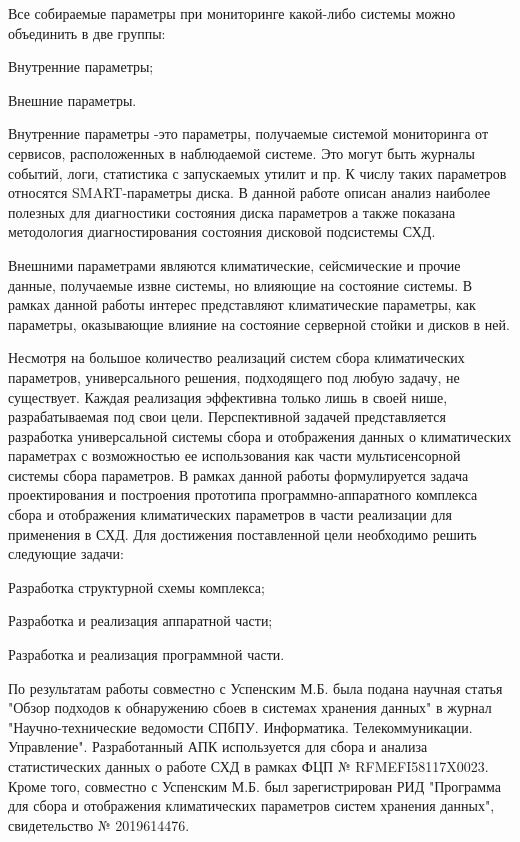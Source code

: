 Все собираемые параметры при мониторинге какой-либо системы можно объединить в две группы: 
\begin{itemize*}
	\item{Внутренние параметры;}
	\item{Внешние параметры.}
\end{itemize*}	

Внутренние параметры -это параметры, получаемые системой мониторинга от сервисов, расположенных в наблюдаемой системе. Это могут быть журналы событий, логи, статистика с запускаемых утилит и пр. К числу таких параметров относятся SMART-параметры диска. В данной работе описан анализ наиболее полезных для диагностики состояния диска параметров а также показана методология диагностирования состояния дисковой подсистемы СХД.

Внешними параметрами являются климатические, сейсмические и прочие данные, получаемые извне системы, но влияющие на состояние системы. В рамках данной работы интерес представляют климатические параметры, как параметры, оказывающие влияние на состояние серверной стойки и дисков в ней. 

Несмотря на большое количество реализаций систем сбора климатических параметров, универсального решения, подходящего под любую задачу, не существует. Каждая реализация эффективна только лишь в своей нише, разрабатываемая под свои цели. Перспективной задачей представляется разработка универсальной системы сбора и отображения данных о климатических параметрах с возможностью ее использования как части мультисенсорной системы сбора параметров.  В рамках данной работы формулируется задача проектирования и построения прототипа программно-аппаратного комплекса сбора и отображения климатических параметров в части реализации для применения в СХД. 
Для достижения поставленной цели необходимо решить следующие задачи:
\begin{itemize*}
	\item{Разработка структурной схемы комплекса;}
	\item{Разработка и реализация аппаратной части;}
	\item{Разработка и реализация программной части.}
\end{itemize*}	
По результатам работы совместно с Успенским М.Б. была подана научная статья "Обзор подходов к обнаружению сбоев в системах хранения данных" в журнал "Научно-технические ведомости СПбПУ. Информатика. Телекоммуникации. Управление". Разработанный АПК используется для сбора и анализа статистических данных о работе СХД в рамках ФЦП № RFMEFI58117X0023. 
Кроме того, совместно с Успенским М.Б. был зарегистрирован РИД "Программа для сбора и отображения климатических параметров систем хранения данных", свидетельство № 2019614476. 
